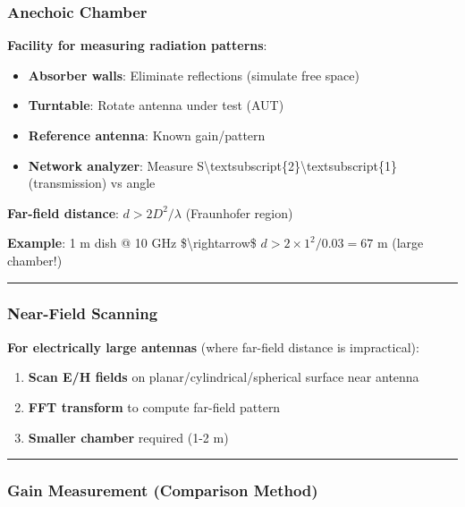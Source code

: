 \subsubsection{Anechoic Chamber}\label{anechoic-chamber}

\textbf{Facility for measuring radiation patterns}:

\begin{itemize}
\tightlist
\item
  \textbf{Absorber walls}: Eliminate reflections (simulate free space)
\item
  \textbf{Turntable}: Rotate antenna under test (AUT)
\item
  \textbf{Reference antenna}: Known gain/pattern
\item
  \textbf{Network analyzer}: Measure
  S\textbackslash textsubscript\{2\}\textbackslash textsubscript\{1\}
  (transmission) vs angle
\end{itemize}

\textbf{Far-field distance}: \(d > 2D^2/\lambda\) (Fraunhofer region)

\textbf{Example}: 1 m dish @ 10 GHz \$\textbackslash rightarrow\$
\(d > 2 \times 1^2 / 0.03 = 67\) m (large chamber!)

\begin{center}\rule{0.5\linewidth}{0.5pt}\end{center}

\subsubsection{Near-Field Scanning}\label{near-field-scanning}

\textbf{For electrically large antennas} (where far-field distance is
impractical):

\begin{enumerate}
\def\labelenumi{\arabic{enumi}.}
\tightlist
\item
  \textbf{Scan E/H fields} on planar/cylindrical/spherical surface near
  antenna
\item
  \textbf{FFT transform} to compute far-field pattern
\item
  \textbf{Smaller chamber} required (1-2 m)
\end{enumerate}

\begin{center}\rule{0.5\linewidth}{0.5pt}\end{center}

\subsubsection{Gain Measurement (Comparison
Method)}\label{gain-measurement-comparison-method}

